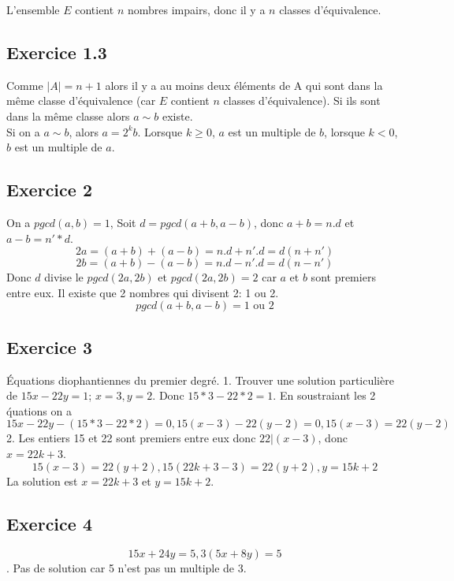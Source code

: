 \documentclass[]{book}
\theoremstyle{definition}
\begin{document}
L'ensemble $E$ contient $n$ nombres impairs, donc il y a $n$ classes d'\'equivalence.

\subsection*{Exercice 1.3}
Comme $|A| = n+1$ alors il y a au moins deux \'el\'ements de A qui sont dans la m\^eme classe d'\'equivalence (car $E$ contient $n$ classes d'\'equivalence). Si ils sont dans la m\^eme classe alors $a \sim b$ existe.\\

Si on a $a \sim b$, alors $a=2^kb$. Lorsque $k\geq 0$, $a$ est un multiple de $b$, lorsque $k<0$, $b$ est un multiple de $a$.

\subsection*{Exercice 2}
On a $pgcd(a,b) = 1$, Soit $d=pgcd(a+b,a-b)$, donc $a+b=n.d$ et $a-b=n'*d$.
$$2a = (a+b)+(a-b) = n.d+n'.d = d(n+n')$$
$$2b = (a+b)-(a-b) = n.d-n'.d = d(n-n')$$
Donc $d$ divise le $pgcd(2a, 2b)$ et $pgcd(2a, 2b)=2$ car $a$ et $b$ sont premiers entre eux. Il existe que 2 nombres qui divisent 2: 1 ou 2.
$$pgcd(a+b,a-b) = 1 \text{ ou } 2$$ 

\subsection*{Exercice 3}
\'Equations diophantiennes du premier degr\'e.
1. Trouver une solution particuli\`ere de $15x - 22y = 1$; $x=3, y=2$. Donc $15*3-22*2 = 1$. En soustraiant les 2 \'quations on a 
$$15x - 22y - (15*3-22*2) = 0, 15(x-3) - 22(y-2) = 0, 15(x-3) = 22(y-2)$$
2. Les entiers 15 et 22 sont premiers entre eux donc $22|(x-3)$, donc $x= 22k+3$.
$$15(x-3) = 22(y+2), 15(22k+3-3) = 22(y+2), y = 15k+2$$
La solution est $x=22k+3$ et $y=15k+2$.

\subsection*{Exercice 4}
$$15x+24y = 5, 3(5x+8y) = 5$$.
Pas de solution car 5 n'est pas un multiple de 3.
\end{document}
